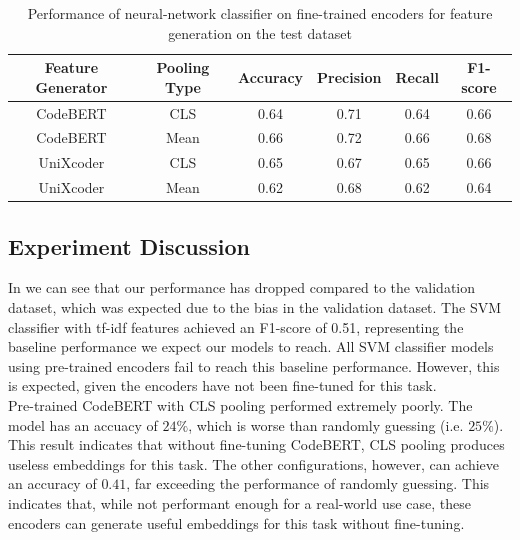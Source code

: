 \begin{table}[H]
    \caption{Performance of neural-network classifier on fine-trained encoders for feature generation on the test dataset}
    \label{tab:test_perfomance_fine_nn}
    \begin{center}
        \begin{tabular}{c|c|c|c|c|c}
            \textbf{Feature Generator} & \textbf{Pooling Type} & \textbf{Accuracy} & \textbf{Precision} & \textbf{Recall} & \textbf{F1-score}  \\
            \hline
            CodeBERT & CLS & 0.64 & 0.71 & 0.64 & 0.66\\
            CodeBERT & Mean & 0.66 & 0.72 & 0.66 & 0.68\\
            UniXcoder & CLS & 0.65 & 0.67 & 0.65 & 0.66\\
            UniXcoder & Mean & 0.62 & 0.68 & 0.62 & 0.64\\
        \end{tabular}
    \end{center}
\end{table}

\subsection{Experiment Discussion}

\noindent
In  we can see that our performance has dropped compared to the validation dataset, which was expected due to the bias in the validation dataset. The SVM classifier with tf-idf features achieved an F1-score of 0.51, representing the baseline performance we expect our models to reach. All SVM classifier models using pre-trained encoders fail to reach this baseline performance. However, this is expected, given the encoders have not been fine-tuned for this task. \\

\noindent
Pre-trained CodeBERT with CLS pooling performed extremely poorly. The model has an accuacy of $24\%$, which is worse than randomly guessing (i.e. $25\%$). This result indicates that without fine-tuning CodeBERT, CLS pooling produces useless embeddings for this task. The other configurations, however, can achieve an accuracy of $0.41$, far exceeding the performance of randomly guessing. This indicates that, while not performant enough for a real-world use case, these encoders can generate useful embeddings for this task without fine-tuning.\\

